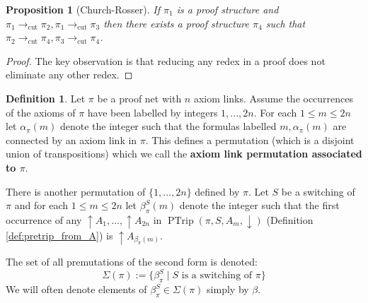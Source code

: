 \documentclass[12pt]{article}
\theoremstyle{plain}
\newtheorem{proposition}[thm]{Proposition}
\theoremstyle{definition}
\newtheorem{defn}[thm]{Definition} %
\newcommand{\lto}{\longrightarrow}
\begin{document}
	\begin{proposition}[Church-Rosser]\label{prop:church_rosser}
		If $\pi_1$ is a proof structure and $\pi_1 \lto_{\operatorname{cut}} \pi_2, \pi_1 \lto_{\operatorname{cut}} \pi_3$ then there exists a proof structure $\pi_4$ such that $\pi_2 \lto_{\operatorname{cut}} \pi_4, \pi_3 \lto_{\operatorname{cut}} \pi_4$.
	\end{proposition}
	\begin{proof}
		The key observation is that reducing any redex in a proof does not eliminate any other redex.
	\end{proof}
	\begin{defn}\label{def:permutations}
		Let $\pi$ be a proof net with $n$ axiom links. Assume the occurrences of the axioms of $\pi$ have been labelled by integers $1,...,2n$. For each $1 \leq m \leq 2n$ let $\alpha_{\pi}(m)$ denote the integer such that the formulas labelled $m,\alpha_{\pi}(m)$ are connected by an axiom link in $\pi$. This defines a permutation (which is a disjoint union of transpositions) which we call the \textbf{axiom link permutation associated to $\pi$}.
		
		There is another permutation of $\lbrace 1,...,2n\rbrace$ defined by $\pi$. Let $S$ be a switching of $\pi$ and for each $1 \leq m \leq 2n$ let $\beta_{\pi}^S(m)$ denote the integer such that the first occurrence of any $\uparrow A_1,...,\uparrow A_{2n}$ in $\operatorname{PTrip}(\pi,S,A_m,\downarrow)$ (Definition \ref{def:pretrip_from_A}) is $\uparrow A_{\beta_{\pi}(m)}$.
		
		The set of all premutations of the second form is denoted:
		\begin{equation}
			\Sigma(\pi) := \lbrace \beta_{\pi}^S \mid S\text{ is a switching of }\pi\rbrace
		\end{equation}
		We will often denote elements of $\beta_{\pi}^S \in \Sigma(\pi)$ simply by $\beta$.
	\end{defn}
\end{document}
